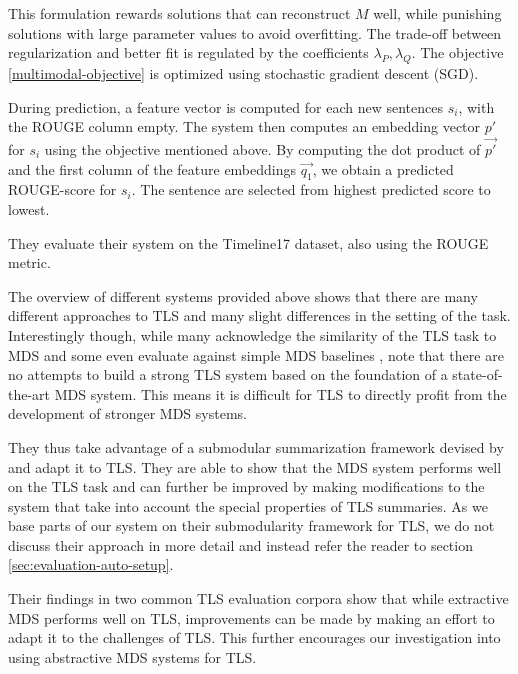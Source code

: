 \documentclass[a4paper,BCOR=10mm]{report}
\numberwithin{lemma}{chapter}
\numberwithin{definition}{chapter}
\begin{document}
This formulation rewards solutions that can reconstruct $M$ well, while punishing solutions with large parameter values to avoid overfitting. The trade-off between regularization and better fit is regulated by the coefficients $\lambda_P, \lambda_Q$.
The objective \ref{multimodal-objective} is optimized using stochastic gradient descent (SGD).

During prediction, a feature vector is computed for each new sentences $s_i$, with the ROUGE column empty. The system then computes an embedding vector $p'$ for $s_i$ using the objective mentioned above. By computing the dot product of $\vec{p'}$ and the first column of the feature embeddings $\vec{q_1}$, we obtain a predicted ROUGE-score for $s_i$.
The sentence are selected from highest predicted score to lowest.

They evaluate their system on the Timeline17 dataset, also using the ROUGE metric.


The overview of different systems provided above shows that there are many different approaches to TLS and many slight differences in the setting of the task. Interestingly though, while many acknowledge the similarity of the TLS task to MDS \citep{yan-trans, tran-headlines} and some even evaluate against simple MDS baselines \citep{yan-trans}, \citet{markert} note that there are no attempts to build a strong TLS system based on the foundation of a state-of-the-art MDS system. This means it is difficult for TLS to directly profit from the development of stronger MDS systems.

They thus take advantage of a submodular summarization framework devised by \citet{lin+bilmes} and adapt it to TLS.
They are able to show that the MDS system performs well on the TLS task and can further be improved by making modifications to the system that take into account the special properties of TLS summaries.
As we base parts of our system on their submodularity framework for TLS, we do not discuss their approach in more detail and instead refer the reader to section \ref{sec:evaluation-auto-setup}.

Their findings in two common TLS evaluation corpora show that while extractive MDS performs well on TLS, improvements can be made by making an effort to adapt it to the challenges of TLS.
This further encourages our investigation into using abstractive MDS systems for TLS.

\end{document}
